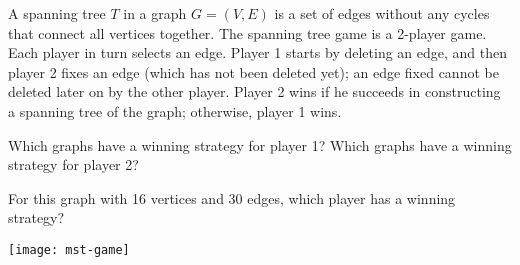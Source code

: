 \documentclass[12pt]{article}
\begin{document}

A spanning tree $T$ in a graph $G=(V,E)$ is a set of edges without any
cycles that connect all vertices together. The spanning tree game is a
2-player game. Each player in turn selects an edge. Player 1 starts by
deleting an edge, and then player 2 fixes an edge (which has not been
deleted yet); an edge fixed
cannot be deleted later on by the other player. Player 2 wins if he
succeeds in constructing a spanning tree of the graph; otherwise,
player 1 wins. 

Which graphs have a winning strategy for player 1? Which graphs have a
winning strategy for player 2?

For this graph with 16 vertices and 30 edges, which player has a
winning strategy? 


\begin{center}
\texttt{[image: mst-game]}
\end{center}
\end{document}
